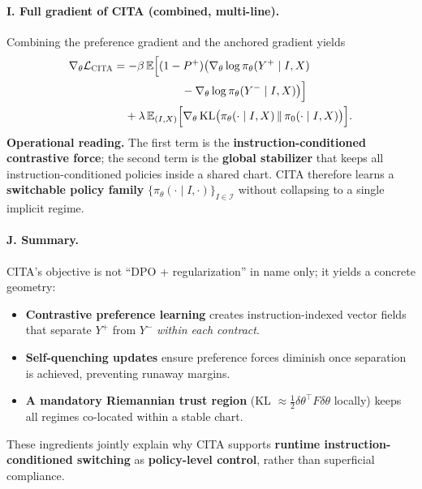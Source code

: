 \vspace{-0.35em}
\paragraph{\textbf{I. Full gradient of CITA (combined, multi-line).}}
Combining the preference gradient and the anchored gradient yields
\begin{align*}
\nabla_\theta \mathcal{L}_{\textsc{CITA}}
&= -\beta\,\mathbb{E}\Big[(1-P^+)\big(\nabla_\theta\log\pi_\theta(Y^+\mid I,X) \\
&\qquad\qquad\qquad -\nabla_\theta\log\pi_\theta(Y^-\mid I,X)\big)\Big] \\
&\quad +\lambda\,\mathbb{E}_{(I,X)}\Big[\nabla_\theta\,\mathrm{KL}\big(\pi_\theta(\cdot\mid I,X)\,\|\,\pi_0(\cdot\mid I,X)\big)\Big].
\end{align*}
\textbf{Operational reading.} The first term is the \textbf{instruction-conditioned contrastive force}; the second term is the \textbf{global stabilizer} that keeps all instruction-conditioned policies inside a shared chart.
CITA therefore learns a \textbf{switchable policy family} $\{\pi_\theta(\cdot\mid I,\cdot)\}_{I\in\mathcal{I}}$ without collapsing to a single implicit regime.

\vspace{-0.35em}
\paragraph{\textbf{J. Summary.}}
CITA’s objective is not ``DPO + regularization'' in name only; it yields a concrete geometry:
\begin{itemize}
\item \textbf{Contrastive preference learning} creates instruction-indexed vector fields that separate $Y^+$ from $Y^-$ \emph{within each contract}.
\item \textbf{Self-quenching updates} ensure preference forces diminish once separation is achieved, preventing runaway margins.
\item \textbf{A mandatory Riemannian trust region} (KL $\approx \tfrac12\delta\theta^\top F\delta\theta$ locally) keeps all regimes co-located within a stable chart.
\end{itemize}
These ingredients jointly explain why CITA supports \textbf{runtime instruction-conditioned switching} as \textbf{policy-level control}, rather than superficial compliance.
